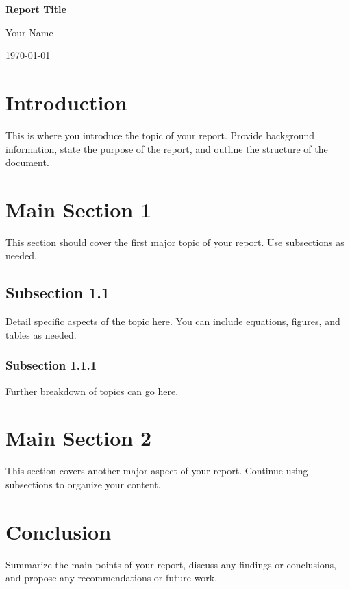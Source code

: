 \documentclass[12pt,a4paper]{report}
\begin{document}
\begin{titlepage}
    \centering
    \vspace*{1in}
    {\huge\bfseries Report Title \par}
    \vspace{1.5in}
    {\Large Your Name \par}
    \vfill
    {\large \today \par}
\end{titlepage}

\begin{abstract}
\noindent
This is a brief summary of your report. It should concisely describe the purpose of the report, the main findings or conclusions, and any recommendations. The abstract is typically around 150-250 words.\cite{exampleCitation}
\end{abstract}

\tableofcontents
\newpage

\chapter{Introduction}
\noindent
This is where you introduce the topic of your report. Provide background information, state the purpose of the report, and outline the structure of the document.

\chapter{Main Section 1}
\noindent
This section should cover the first major topic of your report. Use subsections as needed.

\section{Subsection 1.1}
\noindent
Detail specific aspects of the topic here. You can include equations, figures, and tables as needed.

\subsection{Subsection 1.1.1}
\noindent
Further breakdown of topics can go here.

\chapter{Main Section 2}
\noindent
This section covers another major aspect of your report. Continue using subsections to organize your content.

\chapter{Conclusion}
\noindent
Summarize the main points of your report, discuss any findings or conclusions, and propose any recommendations or future work.

\newpage
\end{document}
